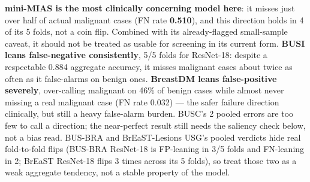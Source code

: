 \documentclass[11pt]{article}
\begin{document}
\begin{table}[htbp]
  \centering
  \caption{Per-class bias, pooled across all test folds. FP rate
  $=1-\text{specificity}$; FN rate $=1-\text{sensitivity}$.}
  \label{tab:bias}
\end{table}

\textbf{mini-MIAS is the most clinically concerning model here}: it misses
just over half of actual malignant cases (FN rate \textbf{0.510}), and this
direction holds in 4 of its 5 folds, not a coin flip. Combined with its
already-flagged small-sample caveat, it should not be treated as usable for
screening in its current form. \textbf{BUSI leans false-negative
consistently}, 5/5 folds for ResNet-18: despite a respectable 0.884
aggregate accuracy, it misses malignant cases about twice as often as it
false-alarms on benign ones. \textbf{BreastDM leans false-positive
severely}, over-calling malignant on 46\% of benign cases while almost
never missing a real malignant case (FN rate 0.032) — the safer failure
direction clinically, but still a heavy false-alarm burden. BUSC's 2
pooled errors are too few to call a direction; the near-perfect result
still needs the saliency check below, not a bias read. BUS-BRA and
BrEaST-Lesions USG's pooled verdicts hide real fold-to-fold flips (BUS-BRA
ResNet-18 is FP-leaning in 3/5 folds and FN-leaning in 2; BrEaST ResNet-18
flips 3 times across its 5 folds), so treat those two as a weak aggregate
tendency, not a stable property of the model.
\end{document}
